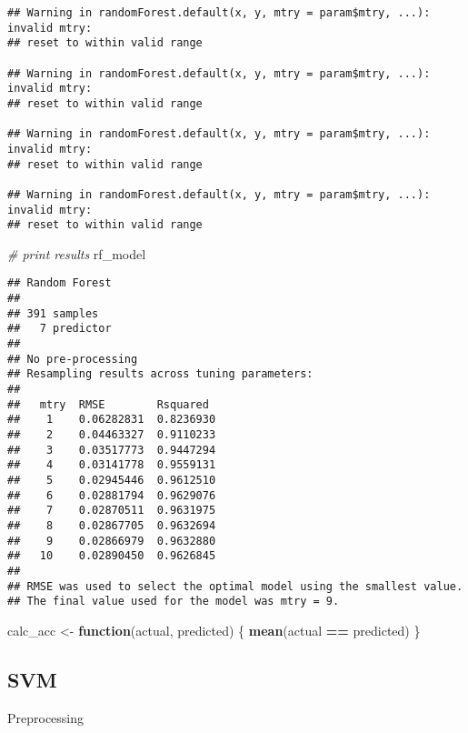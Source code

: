 \documentclass[
]{article}
\newenvironment{Shaded}{\begin{snugshade}}{\end{snugshade}}
\newcommand{\CommentTok}[1]{\textcolor[rgb]{0.56,0.35,0.01}{\textit{#1}}}
\newcommand{\ControlFlowTok}[1]{\textcolor[rgb]{0.13,0.29,0.53}{\textbf{#1}}}
\newcommand{\KeywordTok}[1]{\textcolor[rgb]{0.13,0.29,0.53}{\textbf{#1}}}
\newcommand{\NormalTok}[1]{#1}
\newcommand{\OperatorTok}[1]{\textcolor[rgb]{0.81,0.36,0.00}{\textbf{#1}}}
\newcommand{\StringTok}[1]{\textcolor[rgb]{0.31,0.60,0.02}{#1}}
\begin{document}
\begin{verbatim}
## Warning in randomForest.default(x, y, mtry = param$mtry, ...): invalid mtry:
## reset to within valid range

## Warning in randomForest.default(x, y, mtry = param$mtry, ...): invalid mtry:
## reset to within valid range

## Warning in randomForest.default(x, y, mtry = param$mtry, ...): invalid mtry:
## reset to within valid range

## Warning in randomForest.default(x, y, mtry = param$mtry, ...): invalid mtry:
## reset to within valid range
\end{verbatim}

\begin{Shaded}
\begin{Highlighting}[]
\CommentTok{# print results}
\NormalTok{rf_model}
\end{Highlighting}
\end{Shaded}

\begin{verbatim}
## Random Forest 
## 
## 391 samples
##   7 predictor
## 
## No pre-processing
## Resampling results across tuning parameters:
## 
##   mtry  RMSE        Rsquared 
##    1    0.06282831  0.8236930
##    2    0.04463327  0.9110233
##    3    0.03517773  0.9447294
##    4    0.03141778  0.9559131
##    5    0.02945446  0.9612510
##    6    0.02881794  0.9629076
##    7    0.02870511  0.9631975
##    8    0.02867705  0.9632694
##    9    0.02866979  0.9632880
##   10    0.02890450  0.9626845
## 
## RMSE was used to select the optimal model using the smallest value.
## The final value used for the model was mtry = 9.
\end{verbatim}

\begin{Shaded}
\begin{Highlighting}[]
\NormalTok{calc_acc <-}\StringTok{ }\ControlFlowTok{function}\NormalTok{(actual, predicted) \{}
  \KeywordTok{mean}\NormalTok{(actual }\OperatorTok{==}\StringTok{ }\NormalTok{predicted)}
\NormalTok{\}}
\end{Highlighting}
\end{Shaded}

\hypertarget{svm}{%
\subsection{SVM}\label{svm}}

Preprocessing
\end{document}
